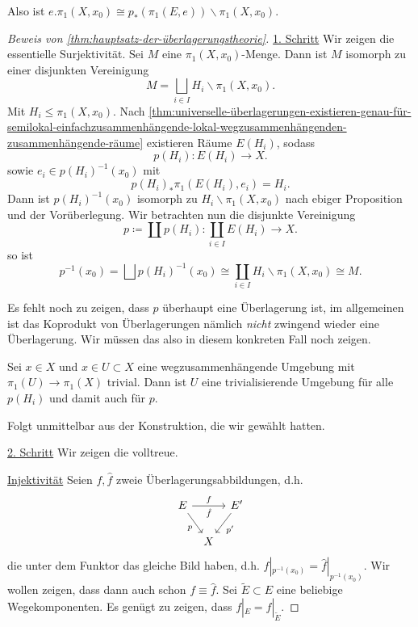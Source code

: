 Also ist $e.\pi_1(X,x_0) \cong p_*(\pi_1(E,e)) \backslash \pi_1(X,x_0)$.

\begin{proof}[Beweis von \autoref{thm:hauptsatz-der-überlagerungstheorie}]
    \underline{1. Schritt} Wir zeigen die essentielle Surjektivität. Sei $M$ eine  $\pi_1(X,x_0)$-Menge. Dann ist $M$ isomorph zu einer disjunkten Vereinigung
    \[
        M = \bigsqcup_{i\in I} H_i \backslash \pi_1(X,x_0)
    .\] 
    Mit $H_i \leq  \pi_1(X,x_0)$. Nach \autoref{thm:universelle-überlagerungen-existieren-genau-für-semilokal-einfachzusammenhängende-lokal-wegzusammenhängenden-zusammenhängende-räume} existieren Räume $E(H_i)$, sodass
     \[
         p(H_i) \colon  E(H_i) \to  X
    .\] 
    sowie $e_i\in p(H_i)^{-1}(x_0)$ mit 
    \[
        p(H_i)_* \pi_1(E(H_i),e_i) = H_i
    .\] 
    Dann ist $p(H_i)^{-1}(x_0)$ isomorph zu $H_i \backslash \pi_1(X,x_0)$ nach ebiger Proposition und der Vorüberlegung. Wir betrachten nun die disjunkte Vereinigung
    \[
        p\coloneqq  \coprod p(H_i) \colon  \coprod _{i \in I} E(H_i) \to  X
    .\] 
    so ist
    \[
        p^{-1} (x_0) = \bigsqcup p(H_i)^{-1}(x_0) \cong \coprod_{i \in I} H_i \backslash \pi_1(X,x_0) \cong M
    .\] 
    \begin{remark}
        Es fehlt noch zu zeigen, dass $p$ überhaupt eine Überlagerung ist, im allgemeinen ist das Koprodukt von Überlagerungen nämlich \textit{nicht} zwingend wieder eine Überlagerung. Wir müssen das also in diesem konkreten Fall noch zeigen.
    \end{remark}
    \begin{claim}
        Sei $x\in X$ und $x\in U\subset X$ eine wegzusammenhängende Umgebung mit $\pi_1(U) \to  \pi_1(X)$ trivial. Dann ist $U$ eine trivialisierende Umgebung für alle  $p(H_i)$ und damit auch für  $p$.
    \end{claim}
    \begin{subproof}
        Folgt unmittelbar aus der Konstruktion, die wir gewählt hatten.
    \end{subproof}
    \underline{2. Schritt} Wir zeigen die volltreue.

    \underline{Injektivität} Seien $f,\hat{f}$ zweie Überlagerungsabbildungen, d.h.
    \[
    \begin{tikzcd}[column sep = tiny]
        E \ar{rr}{f}[swap]{\hat{f}} \ar[swap]{dr}{p} & & E' \ar{dl}{p'} \\
    & X
    \end{tikzcd}
    \]
    die unter dem Funktor das gleiche Bild haben, d.h. $f|_{p^{-1} (x_0)} = \hat{f}|_{p^{-1} (x_0)}$. Wir wollen zeigen, dass dann auch schon $f \equiv  \hat{f}$. Sei $\tilde{E} \subset E$ eine beliebige Wegekomponenten. Es genügt zu zeigen, dass $f|_E = \hat{f}|_{\tilde{E}}$.


\end{proof}
